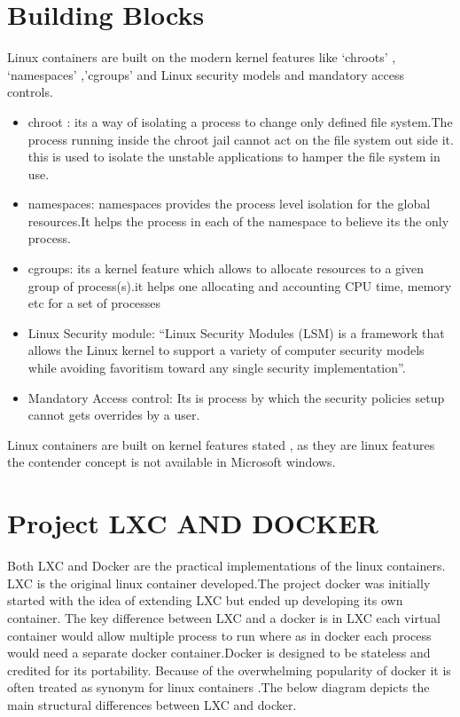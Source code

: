 \documentclass[9pt,twocolumn,twoside]{../../styles/osajnl}
\begin{document}
\section{Building Blocks}

 Linux containers are built on the modern kernel features like
‘chroots’ , ‘namespaces’ ,’cgroups’ and Linux security models and
mandatory access controls.\cite{www-bondner}
\begin{itemize}
\item chroot :
its a way of isolating a process to change only defined file
system.The process running inside the chroot jail cannot act on the
file system out side it. this is used to isolate the unstable
applications to hamper the file system in use.\cite{www-ubuntu}
\item namespaces:
namespaces provides the process level isolation for the global
resources.It helps the process in each of the namespace to believe its
the only process.\cite{www-bondner}
\item cgroups: 
its a kernel feature which allows to
allocate resources to a given group of process(s).it helps one
allocating and accounting CPU time, memory etc for a set of
processes\cite{www-infoworld}
\item  Linux Security module:
 “Linux Security Modules (LSM) is a
framework that allows the Linux kernel to support a variety of
computer security models while avoiding favoritism toward any single
security implementation”.\cite{www-wiki-LSM}
\item Mandatory Access control: 
Its is process
by which the security policies setup cannot gets overrides by a
user. \cite{www-linux}
\end{itemize} 
Linux containers are built on kernel features stated , as they are linux
features the contender concept is not available in Microsoft windows. 

\section{Project LXC AND DOCKER}
Both LXC and Docker are the practical implementations of the linux
containers.  LXC is the original linux container developed.The project
docker was initially started with the idea of extending LXC but ended
up developing its own container. The key difference between LXC and a
docker is in LXC each virtual container would allow multiple process
to run where as in docker each process would need a separate docker
container.Docker is designed to be stateless and credited for its
portability. Because of the overwhelming popularity of docker it is
often treated as synonym for linux containers .The below diagram
depicts the main structural differences between LXC and docker.\cite{www-lxc-docker}
\end{document}
